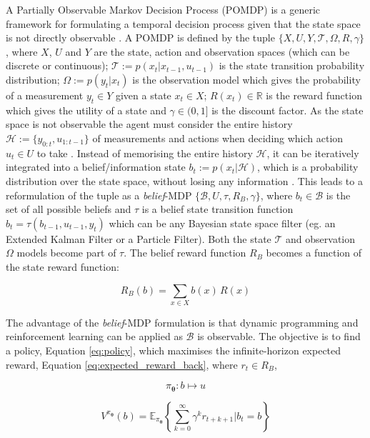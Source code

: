 \documentclass[final,5p,times,twocolumn]{elsarticle}
\newcommand{\Param}{\boldsymbol{\theta}}
\begin{document}
A Partially Observable Markov Decision Process (POMDP) is a generic framework for formulating a temporal decision process 
given that the state space is not directly observable \cite{Sondik_1973}. A POMDP is defined by the tuple $\{X,U,Y,\mathcal{T},\Omega,R,\gamma\}$, 
where $X$, $U$ and $Y$ are the state, action and observation spaces (which can be discrete or continuous);
${\mathcal{T}:= p(x_t|x_{t-1},u_{t-1})}$ is the state transition probability distribution; $\Omega := p(y_t|x_t)$ is 
the observation model which gives the probability of a measurement $y_t \in Y$ given a state $x_t \in X$; 
$R(x_t) \in \mathbb{R}$ is the reward function which gives the utility of a state and $\gamma \in (0,1]$ is the discount factor. As the state space is not 
observable the agent must consider the entire history $\mathcal{H}:= \{y_{0:t},u_{1:t-1}\}$ of measurements and actions
when deciding which action $u_t \in U$ to take \cite{Ross08onlineplanning}. Instead of memorising the entire history $\mathcal{H}$, 
it can be iteratively integrated into a belief/information state ${b_t := p(x_t|\mathcal{H})}$, which 
is a probability distribution over the state space, without losing any information \cite{Milos_POMDP_2000}.
This leads to a reformulation of the tuple as a \textit{belief}-MDP $\{\mathcal{B},U,\tau,R_B,\gamma\}$, where $b_t \in \mathcal{B}$ is 
the set of all possible beliefs and $\tau$ is a belief state transition function $b_t = \tau(b_{t-1},u_{t-1},y_t)$ 
which can be any Bayesian state space filter (eg. an Extended Kalman Filter or a Particle Filter). Both the state $\mathcal{T}$ and observation 
$\Omega$ models become part of $\tau$. The belief reward function $R_B$ becomes a function of the state reward function:

\begin{equation}\label{eq:bel_reward_back}
  R_B(b) = \sum\limits_{x \in X} b(x)\, R(x)
\end{equation}

The advantage of the \textit{belief}-MDP formulation is that dynamic programming and reinforcement
learning can be applied as $\mathcal{B}$ is observable. The objective is to find a 
policy, Equation \ref{eq:policy}, which maximises the infinite-horizon expected reward, Equation 
\ref{eq:expected_reward_back}, where $r_t \in R_B$, 

\begin{equation}\label{eq:policy}
  \pi_{\Param} : b \mapsto u
\end{equation}

\begin{equation}\label{eq:expected_reward_back}
 V^{\pi_{\Param}}(b) = \mathbb{E}_{\pi_{\Param}} \left\{  \sum^{\infty}_{k=0} \gamma^k r_{t+k+1} \Bigg\lvert b_t = b \right\}
\end{equation}
\end{document}
